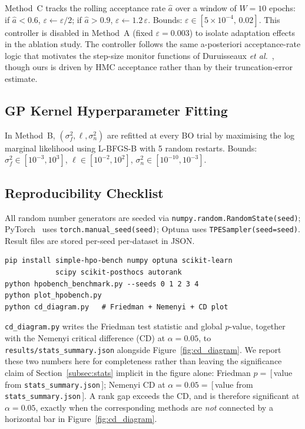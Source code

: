 \documentclass[11pt]{article}
\theoremstyle{definition}
\begin{document}
Method~C tracks the rolling acceptance rate $\hat{a}$ over a window
of $W=10$ epochs: if $\hat{a}<0.6$, $\varepsilon\leftarrow\varepsilon/2$;
if $\hat{a}>0.9$, $\varepsilon\leftarrow1.2\,\varepsilon$. Bounds:
$\varepsilon\in[5\times10^{-4},\,0.02]$. This controller is disabled
in Method~A (fixed $\varepsilon=0.003$) to isolate adaptation effects
in the ablation study. The controller follows the same a-posteriori
acceptance-rate logic that motivates the step-size monitor functions
of Duruisseaux \emph{et al.}~\cite{duruisseaux2021adaptive}, though
ours is driven by HMC acceptance rather than by their truncation-error
estimate.

\subsection{GP Kernel Hyperparameter Fitting}

In Method~B, $(\sigma_f^2,\ell,\sigma_n^2)$ are refitted at every BO
trial by maximising the log marginal likelihood using L-BFGS-B with
5 random restarts. Bounds: $\sigma_f^2\in[10^{-3},10^3]$,
$\ell\in[10^{-2},10^2]$, $\sigma_n^2\in[10^{-10},10^{-3}]$.

\subsection{Reproducibility Checklist}
\label{app:experimental_repro}

All random number generators are seeded via
\texttt{numpy.random.RandomState(seed)};
PyTorch~\cite{paszke2019} uses \texttt{torch.manual\_seed(seed)};
Optuna uses \texttt{TPESampler(seed=seed)}.
Result files are stored per-seed per-dataset in JSON.

\begin{verbatim}
pip install simple-hpo-bench numpy optuna scikit-learn
            scipy scikit-posthocs autorank
python hpobench_benchmark.py --seeds 0 1 2 3 4
python plot_hpobench.py
python cd_diagram.py   # Friedman + Nemenyi + CD plot
\end{verbatim}

\texttt{cd\_diagram.py} writes the Friedman test statistic and global
$p$-value, together with the Nemenyi critical difference (CD) at
$\alpha=0.05$, to \texttt{results/stats\_summary.json} alongside
Figure~\ref{fig:cd_diagram}. We report these two numbers here for
completeness rather than leaving the significance claim of
Section~\ref{subsec:stats} implicit in the figure alone: Friedman
$p = $\,[\,value from \texttt{stats\_summary.json}\,]; Nemenyi CD at
$\alpha=0.05 = $\,[\,value from \texttt{stats\_summary.json}\,]. A
rank gap exceeds the CD, and is therefore significant at
$\alpha=0.05$, exactly when the corresponding methods are
\emph{not} connected by a horizontal bar in Figure~\ref{fig:cd_diagram}.
\end{document}
